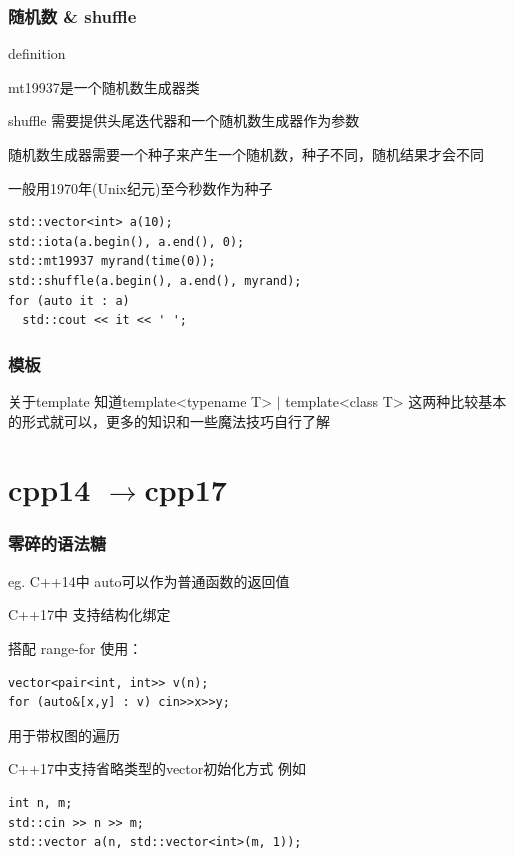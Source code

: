 \documentclass{beamer}
\begin{document}
  \begin{frame}[fragile]
    \frametitle{随机数 \& shuffle}
    \begin{block}{definition}
  
      mt19937是一个随机数生成器类

      shuffle 需要提供头尾迭代器和一个随机数生成器作为参数

      随机数生成器需要一个种子来产生一个随机数，种子不同，随机结果才会不同

      一般用1970年(Unix纪元)至今秒数作为种子
      
      \begin{lstlisting}  
std::vector<int> a(10);
std::iota(a.begin(), a.end(), 0);
std::mt19937 myrand(time(0));
std::shuffle(a.begin(), a.end(), myrand);
for (auto it : a)
  std::cout << it << ' ';
      \end{lstlisting}
    \end{block}
  \end{frame}

  \begin{frame}
    \frametitle{模板}
      \begin{block}{关于template}
        知道template<typename T> $\mid$ template<class T>
        这两种比较基本的形式就可以，更多的知识和一些魔法技巧自行了解
      \end{block}
  \end{frame}

  \section{cpp14 \texorpdfstring{$\to$}\ cpp17}

  \begin{frame}[fragile]
    \frametitle{零碎的语法糖}
    \begin{block}{eg.}
      C++14中 auto可以作为普通函数的返回值
  
      C++17中 支持结构化绑定
  
      搭配 range-for 使用：
      \begin{lstlisting}
vector<pair<int, int>> v(n);
for (auto&[x,y] : v) cin>>x>>y;
      \end{lstlisting}

      用于带权图的遍历

      C++17中支持省略类型的vector初始化方式
      例如
      \begin{lstlisting}
int n, m;
std::cin >> n >> m;
std::vector a(n, std::vector<int>(m, 1));
      \end{lstlisting}
    \end{block}
  \end{frame}
\end{document}
